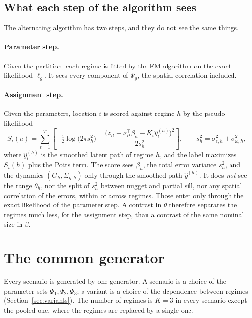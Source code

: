 \documentclass[11pt]{article}
\begin{document}
\subsection{What each step of the algorithm sees}\label{sec:score}

The alternating algorithm has two steps, and they do not see the same things.

\paragraph{Parameter step.} Given the partition, each regime is fitted by the EM algorithm on the exact likelihood $\ell_g$. It sees every component of $\Psi_g$, the spatial correlation included.

\paragraph{Assignment step.} Given the parameters, location $i$ is scored against regime $h$ by the pseudo-likelihood
\begin{equation}\label{eq:score}
  S_i(h) = \sum_{t=1}^T \left[ -\tfrac12 \log\bigl(2\pi s^2_h\bigr) - \frac{\bigl(z_{it} - x_{it}^\top\beta_h - K_i\hat y^{(h)}_t\bigr)^2}{2 s^2_h} \right],
  \qquad s^2_h = \sigma^2_{\epsilon,h} + \sigma^2_{\omega,h},
\end{equation}
where $\hat y^{(h)}_t$ is the smoothed latent path of regime $h$, and the label maximizes $S_i(h)$ plus the Potts term. The score sees $\beta_h$, the total error variance $s^2_h$, and the dynamics $(G_h, \Sigma_{\eta,h})$ only through the smoothed path $\hat y^{(h)}$. It does \emph{not} see the range $\theta_h$, nor the split of $s^2_h$ between nugget and partial sill, nor any spatial correlation of the errors, within or across regimes. Those enter only through the exact likelihood of the parameter step. A contrast in $\theta$ therefore separates the regimes much less, for the assignment step, than a contrast of the same nominal size in $\beta$.

\section{The common generator}\label{sec:generator}

Every scenario is generated by one generator. A scenario is a choice of the parameter sets $\Psi_1, \Psi_2, \Psi_3$; a variant is a choice of the dependence between regimes (Section~\ref{sec:variants}). The number of regimes is $K = 3$ in every scenario except the pooled one, where the regimes are replaced by a single one.
\end{document}
